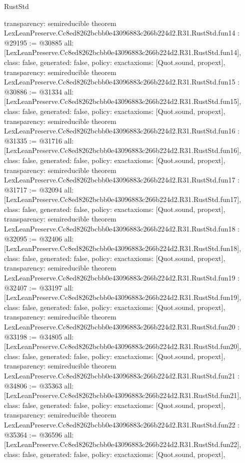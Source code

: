 \begin{lexlean}{RustStd}
\begin{coremodule}
{  transparency: semireducible
}
theorem LexLeanPreserve.Cc8ed8262bcbb0e43096883c266b224d2.R31.RustStd.fun14 : @29195 := @30885 {
  all: [LexLeanPreserve.Cc8ed8262bcbb0e43096883c266b224d2.R31.RustStd.fun14],
  class: false,
  generated: false,
  policy: exact{axioms: [Quot.sound, propext]},
  transparency: semireducible
}
theorem LexLeanPreserve.Cc8ed8262bcbb0e43096883c266b224d2.R31.RustStd.fun15 : @30886 := @31334 {
  all: [LexLeanPreserve.Cc8ed8262bcbb0e43096883c266b224d2.R31.RustStd.fun15],
  class: false,
  generated: false,
  policy: exact{axioms: [Quot.sound, propext]},
  transparency: semireducible
}
theorem LexLeanPreserve.Cc8ed8262bcbb0e43096883c266b224d2.R31.RustStd.fun16 : @31335 := @31716 {
  all: [LexLeanPreserve.Cc8ed8262bcbb0e43096883c266b224d2.R31.RustStd.fun16],
  class: false,
  generated: false,
  policy: exact{axioms: [Quot.sound, propext]},
  transparency: semireducible
}
theorem LexLeanPreserve.Cc8ed8262bcbb0e43096883c266b224d2.R31.RustStd.fun17 : @31717 := @32094 {
  all: [LexLeanPreserve.Cc8ed8262bcbb0e43096883c266b224d2.R31.RustStd.fun17],
  class: false,
  generated: false,
  policy: exact{axioms: [Quot.sound, propext]},
  transparency: semireducible
}
theorem LexLeanPreserve.Cc8ed8262bcbb0e43096883c266b224d2.R31.RustStd.fun18 : @32095 := @32406 {
  all: [LexLeanPreserve.Cc8ed8262bcbb0e43096883c266b224d2.R31.RustStd.fun18],
  class: false,
  generated: false,
  policy: exact{axioms: [Quot.sound, propext]},
  transparency: semireducible
}
theorem LexLeanPreserve.Cc8ed8262bcbb0e43096883c266b224d2.R31.RustStd.fun19 : @32407 := @33197 {
  all: [LexLeanPreserve.Cc8ed8262bcbb0e43096883c266b224d2.R31.RustStd.fun19],
  class: false,
  generated: false,
  policy: exact{axioms: [Quot.sound, propext]},
  transparency: semireducible
}
theorem LexLeanPreserve.Cc8ed8262bcbb0e43096883c266b224d2.R31.RustStd.fun20 : @33198 := @34805 {
  all: [LexLeanPreserve.Cc8ed8262bcbb0e43096883c266b224d2.R31.RustStd.fun20],
  class: false,
  generated: false,
  policy: exact{axioms: [Quot.sound, propext]},
  transparency: semireducible
}
theorem LexLeanPreserve.Cc8ed8262bcbb0e43096883c266b224d2.R31.RustStd.fun21 : @34806 := @35363 {
  all: [LexLeanPreserve.Cc8ed8262bcbb0e43096883c266b224d2.R31.RustStd.fun21],
  class: false,
  generated: false,
  policy: exact{axioms: [Quot.sound, propext]},
  transparency: semireducible
}
theorem LexLeanPreserve.Cc8ed8262bcbb0e43096883c266b224d2.R31.RustStd.fun22 : @35364 := @36596 {
  all: [LexLeanPreserve.Cc8ed8262bcbb0e43096883c266b224d2.R31.RustStd.fun22],
  class: false,
  generated: false,
  policy: exact{axioms: [Quot.sound, propext]},
}
\end{coremodule}
\end{lexlean}
